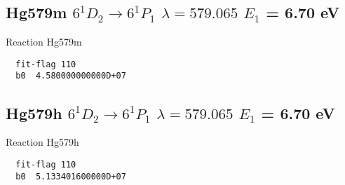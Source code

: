 \documentclass[12pt]{article}
\begin{document}
\subsection{
Hg579m   $6^1D_2 \rightarrow 6^1P_1 $ $\lambda= 579.065$ $E_1$ = 6.70 eV
}
Reaction Hg579m
\begin{small}\begin{verbatim}
  fit-flag 110
  b0  4.580000000000D+07
\end{verbatim}\end{small}

\subsection{
Hg579h   $6^1D_2 \rightarrow 6^1P_1 $ $\lambda= 579.065$ $E_1$ = 6.70 eV
}
Reaction Hg579h
\begin{small}\begin{verbatim}
  fit-flag 110
  b0  5.133401600000D+07
\end{verbatim}\end{small}
\end{document}
